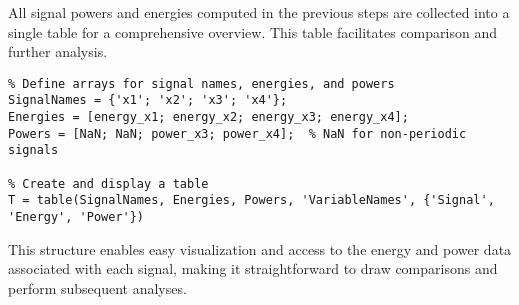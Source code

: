 
\item[(f)]
All signal powers and energies computed in the previous steps are collected into a single table for a comprehensive overview.
This table facilitates comparison and further analysis.

\begin{verbatim}
% Define arrays for signal names, energies, and powers
SignalNames = {'x1'; 'x2'; 'x3'; 'x4'};
Energies = [energy_x1; energy_x2; energy_x3; energy_x4];
Powers = [NaN; NaN; power_x3; power_x4];  % NaN for non-periodic signals

% Create and display a table
T = table(SignalNames, Energies, Powers, 'VariableNames', {'Signal', 'Energy', 'Power'})
\end{verbatim}

This structure enables easy visualization and access to the energy and power data associated with each signal,
making it straightforward to draw comparisons and perform subsequent analyses.
